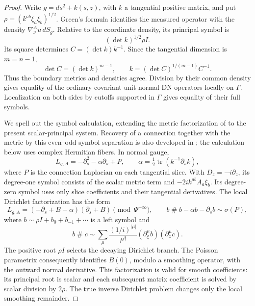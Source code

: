 \begin{proof}
Write \(g=ds^2+k(s,z)\), with \(k\) a tangential positive matrix,
and put \(\rho=(k^{ab}\xi_a\xi_b)^{1/2}\).  Green's formula identifies
the measured operator with the density
\(\nabla^A_\nu u\,dS_g\).  Relative to the coordinate density, its
principal symbol is
\[
             (\det k)^{1/2}\rho I.
\]
Its square determines \(C=(\det k)k^{-1}\).  Since the tangential
dimension is \(m=n-1\),
\[
 \det C=(\det k)^{m-1},\qquad
 k=(\det C)^{1/(m-1)}C^{-1}.
\]
Thus the boundary metrics and densities agree.  Division by their
common density gives equality of the ordinary covariant unit-normal
DN operators locally on \(\Gamma\).  Localization on both sides by
cutoffs supported in \(\Gamma\) gives equality of their full symbols.

We spell out the symbol calculation, extending the metric
factorization of \cite{LeeUhlmann1989} to the present scalar-principal
system.  Recovery of a connection together with the metric by this
even--odd symbol separation is also developed in
\cite[Theorem~1.1 and Section~3.3]{Gabdurakhmanov2021DN}; the
calculation below uses complex Hermitian fibers.  In normal gauge,
\[
 L_{g,A}=-\partial_s^2-\alpha\partial_s+P,
 \qquad \alpha=\tfrac12\operatorname{tr}(k^{-1}\partial_s k),
\]
where \(P\) is the connection Laplacian on each tangential slice.
With \(D_z=-i\partial_z\), its degree-one symbol consists of the
scalar metric term and \(-2ik^{ab}A_a\xi_b\).  Its degree-zero
symbol uses only slice coefficients and their tangential derivatives.
The local Dirichlet factorization has the form
\[
 L_{g,A}=(-\partial_s+B-\alpha)(\partial_s+B)
                 \pmod{\Psi^{-\infty}},
 \qquad
 b\mathbin{\#}b-\alpha b-\partial_s b\sim\sigma(P),
\]
where \(b\sim\rho I+b_0+b_{-1}+\cdots\) is a left symbol and
\[
 b\mathbin{\#}c\sim
 \sum_{\mu}\frac{(1/i)^{|\mu|}}{\mu!}
       (\partial_\xi^\mu b)(\partial_z^\mu c).
\]
The positive root \(\rho I\) selects the decaying Dirichlet branch.
The Poisson parametrix consequently identifies \(B(0)\), modulo a
smoothing operator, with the outward normal derivative.  This
factorization is valid for smooth coefficients: its principal root
is scalar and each subsequent matrix coefficient is solved by
scalar division by \(2\rho\).  The true inverse Dirichlet problem
changes only the local smoothing remainder.


\end{proof}
